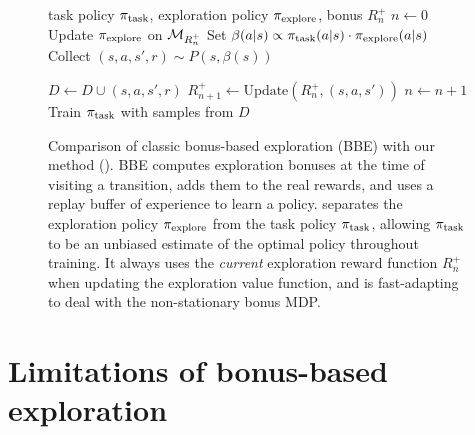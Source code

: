 \begin{figure}
\begin{algorithm}[H]
    \centering
    \caption{\algname{}}\label{alg:deep}
    \begin{algorithmic}[1]
        task policy $\pi_{\text{task}}$, exploration policy $\pi_{\text{explore}}$, bonus $R^+_n$
        \State $n \gets 0$
        \Repeat
            \State Update $\pi_{\text{explore}}$ on $\mathcal{M}_{R^+_n}$
                \State Set $\beta(a|s) \propto \pi_{\text{task}}(a|s) \cdot \pi_{\text{explore}}(a|s)$ %
                \State Collect $(s, a, s', r) \sim P(s, \beta(s))$
                \item[]
                \State $D \gets D \cup (s, a, s', r)$
                \State $R^+_{n+1} \gets \text{Update}(R^+_n, (s, a, s'))$
                \State $n \gets n + 1$
            \EndFor
            \State Train $\pi_{\text{task}}$ with samples from $D$
    \end{algorithmic}
\end{algorithm}
\caption{
Comparison of classic bonus-based exploration (BBE) with our method (\algshort{}).
BBE computes exploration bonuses at the time of visiting a transition, adds them to the real rewards, and uses a replay buffer of experience to learn a policy.
\algshort{} separates the exploration policy $\pi_{\text{explore}}$ from the task policy $\pi_{\text{task}}$, allowing $\pi_{\text{task}}$ to be an unbiased estimate of the optimal policy throughout training.
It always uses the \emph{current} exploration reward function $R_n^+$ when updating the exploration value function, and is fast-adapting to deal with the non-stationary bonus MDP.
}
\end{figure}


\section{Limitations of bonus-based exploration}

